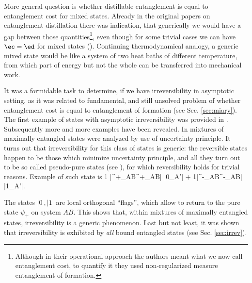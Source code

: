 \documentclass[rmp,12pt,preprint]{revtex4-2}
\begin{document}
More general question is whether distillable entanglement is equal to entanglement
cost for mixed states. Already in the original papers on entanglement distillation \cite{BBPSSW1996,BDSW1996}
there was indication, that generically we would have a gap
between those quantities\footnote{Although in their operational approach
the authors meant what we now call entanglement cost, to
quantify it they used non-regularized measure entanglement of formation.
},
even though for some trivial cases we can have $\ec=\ed$ for mixed states (\cite{termo}).
Continuing thermodynamical analogy, a generic mixed state would be like
a system of two heat baths of different temperature, from which part of energy but not the whole can be transferred into mechanical work.

It was a formidable task to determine, if we have irreversibility in asymptotic setting,
as it was related to fundamental, and still unsolved problem of whether entanglement cost is equal to  entanglement of formation (see Sec. \ref{sec:miary}).
The first example of states with asymptotic irreversibility was
provided in \cite{VidalC-irre}. Subsequently more and more
examples have been revealed. In \cite{VollbrechtWW2003-irrev}
mixtures of maximally entangled states were analyzed by use of
uncertainty principle. It turns out that irreversibility for this
class of states is generic: the reversible states happen to be those
which minimize uncertainty principle, and all they turn out to be so
called pseudo-pure states (see \cite{termo}), for which
reversibility holds for trivial reasons.  Example of such state is
\be
{1} |\psi^+_{AB}\>\<\psi^+_{AB}| \ot |0\>_{A'}| +
{1}|\psi^-_{AB}\>\<\psi^-_{AB}| \ot |1\>_{A'}|.
\ee

The states
$|0\>,|1\>$ are local orthogonal ``flags'', which allow to return to the
pure state $\psi_+$ on system $AB$. This shows that, within mixtures
of maximally entangled  states, irreversibility is a generic
phenomenon. Last but not least, it was shown that irreversibility is
exhibited by {\it all} bound entangled states
\cite{YangHHS2005-cost} (see Sec. \ref{sec:irrev}).
\end{document}
